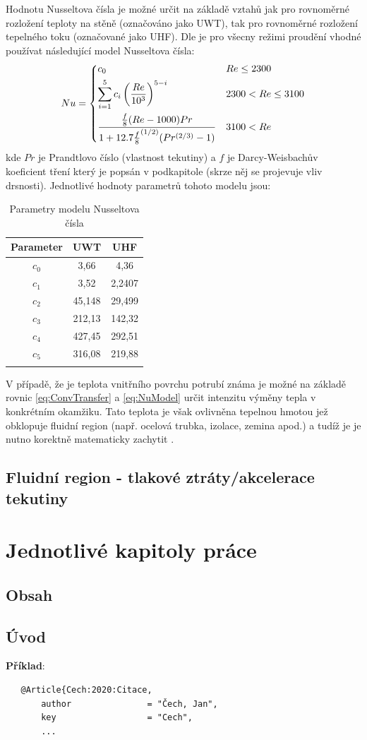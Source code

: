 Hodnotu Nusseltova čísla je možné určit na základě vztahů jak pro rovnoměrné 
rozložení teploty na stěně (označováno jako UWT), tak pro rovnoměrné rozložení
tepelného toku (označované jako UHF). Dle \cite{Abraham2009} je pro všecny
režimi proudění vhodné používat následující model Nusseltova čísla:
\begin{equation}
\label{eq:NuModel}
  Nu = 
  \begin{dcases}
    c_0 & Re\leq 2300 \\
    \sum_{i=1}^{5} c_i\left(\frac{Re}{10^3}\right)^{5-i} & 2300 < Re\le 3100 \\
    \frac{\frac{f}{8}(Re-1000)Pr}
    {1+12.7{\frac{f}{8}}^{(1/2)}(Pr^{(2/3)}-1)} & 3100 < Re
  \end{dcases} 
\end{equation}
kde \(Pr\) je Prandtlovo číslo (vlastnost tekutiny) a \(f\) je Darcy-Weisbachův 
koeficient tření který je popsán v podkapitole  (skrze něj 
se projevuje vliv drsnosti). Jednotlivé hodnoty parametrů tohoto modelu jsou:
\begin{table}[H]
  \label{tab:NuModel}
  \caption{Parametry modelu Nusseltova čísla}
  \vskip6pt
  \centering
  \begin{tabular}{ccc}
    \toprule
    Parameter & UWT & UHF \\ [0.5ex]
    \hline
    \(c_0\) & 3,66 & 4,36 \\ 
    \(c_1\) & 3,52 & 2,2407 \\
    \(c_2\) & 45,148 & 29,499 \\
    \(c_3\) & 212,13 & 142,32 \\
    \(c_4\) & 427,45 & 292,51 \\
    \(c_5\) & 316,08 & 219,88 \\
    \bottomrule \\[0.1mm]
  \end{tabular}
\end{table}
V případě, že je teplota vnitřního povrchu potrubí známa je možné na základě 
rovnic \ref{eq:ConvTransfer} a \ref{eq:NuModel} určit intenzitu výměny tepla v
konkrétním okamžiku. Tato teplota je však ovlivněna tepelnou hmotou jež 
obklopuje fluidní region (např. ocelová trubka, izolace, zemina apod.) a tudíž
je je nutno korektně matematicky zachytit .
\section{Fluidní region - tlakové ztráty/akcelerace tekutiny}

\chapter{Jednotlivé kapitoly práce}
\label{kapitoly}

\section{Obsah}
\label{obsah}

\section{Úvod}
\label{uvod}

\textbf{Příklad}:
\begin{verbatim}
   @Article{Cech:2020:Citace,
	   author               = "Čech, Jan",
	   key                  = "Cech",
	   ... 
\end{verbatim}


